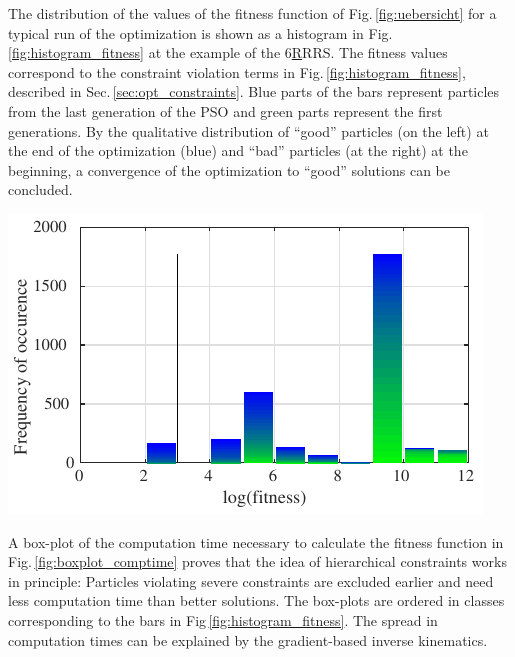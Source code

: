 \documentclass[fleqn,a4paper,10pt]{article}
\renewenvironment{figure}
  {\par\vspace{6pt}\noindent\minipage{\linewidth}}
  {\endminipage\par\vspace{6pt}}
\begin{document}
\begin{multicols}{2}
The distribution of the values of the fitness function of Fig.\,\ref{fig:uebersicht} for a typical run of the optimization is shown as a histogram in Fig.\,\ref{fig:histogram_fitness} at the example of the 6\underline{R}RRS.
The fitness values correspond to the constraint violation terms in Fig.\,\ref{fig:histogram_fitness}, described in Sec.\,\ref{sec:opt_constraints}.
Blue parts of the bars represent particles from the last generation of the PSO and green parts represent the first generations.
By the qualitative distribution of ``good'' particles (on the left) at the end of the optimization (blue) and ``bad'' particles (at the right) at the beginning, a convergence of the optimization to ``good'' solutions can be concluded.
%
\begin{figure}
\centering
\includegraphics[align=t,smash=br,]{./Bilder/figure_histogram_fitness.pdf}

\label{fig:histogram_fitness}
\end{figure}
%
A box-plot of the computation time necessary to calculate the fitness function in Fig.\,\ref{fig:boxplot_comptime} proves that the idea of hierarchical constraints works in principle: Particles violating severe constraints are excluded earlier and need less computation time than better solutions.
The box-plots are ordered in classes corresponding to the bars in Fig\,\ref{fig:histogram_fitness}.
The spread in computation times can be explained by the gradient-based inverse kinematics.


\end{multicols}
\end{document}
